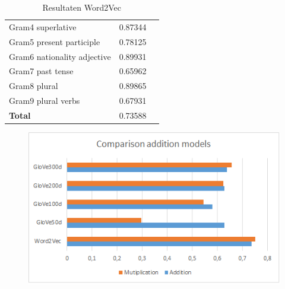 \begin{table}[h!]
{\begin{tabular}{| l | c | r}
        	Gram4 superlative 			& 0.87344 \\
        	Gram5 present participle		& 0.78125 \\
        	Gram6 nationality adjective 		& 0.89931 \\
        	Gram7 past tense 			& 0.65962 \\
        	Gram8 plural 				& 0.89865 \\
        	Gram9 plural verbs 			& 0.67931 \\
        	\textbf{Total}				& 0.73588 \\ \hline
        \end{tabular}
}
\caption[Resultaten Word2Vec models]
        {Resultaten Word2Vec}
    \label{word2Vec}
\end{table}

\begin{figure}[ht!]
	\centering
	\includegraphics[width=130mm]{images/chart1.png}
\end{figure}

